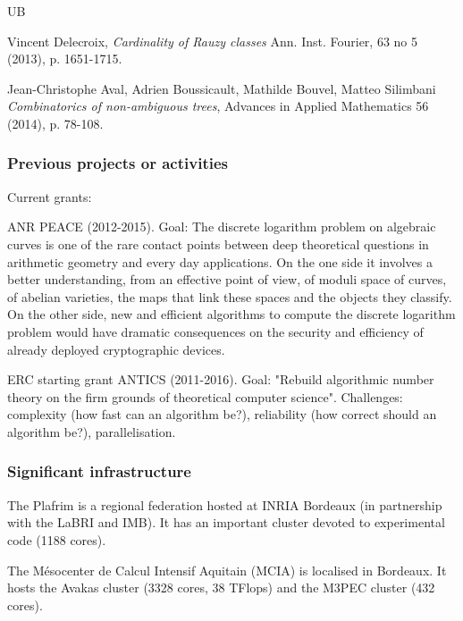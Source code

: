 \begin{sitedescription}{UB}
\begin{compactenum}
\item
Vincent Delecroix,
\textit{Cardinality of Rauzy classes}
Ann. Inst. Fourier, 63 no 5 (2013), p. 1651-1715.

\item
Jean-Christophe Aval, Adrien Boussicault, Mathilde Bouvel, Matteo Silimbani
\textit{Combinatorics of non-ambiguous trees},
Advances in Applied Mathematics 56 (2014), p. 78-108.
\end{compactenum}

\subsubsection*{Previous projects or activities}

Current grants:
\begin{compactenum}
\item
 ANR PEACE (2012-2015).
    Goal: The discrete logarithm problem on algebraic curves is one of the rare
    contact points between deep theoretical questions in arithmetic geometry and
    every day applications. On the one side it involves a better understanding,
    from an effective point of view, of moduli space of curves, of abelian
    varieties, the maps that link these spaces and the objects they classify.
    On the other side, new and efficient algorithms to compute the discrete
    logarithm problem would have dramatic consequences on the security and
    efficiency of already deployed cryptographic devices. 

\item
ERC starting grant ANTICS (2011-2016).
    Goal: "Rebuild algorithmic number theory on the firm grounds of theoretical
    computer science".
    Challenges: complexity (how fast can an algorithm be?), reliability
    (how correct should an algorithm be?), parallelisation.
\end{compactenum}

\subsubsection*{Significant infrastructure}
\begin{compactenum}
\item The Plafrim is a regional federation hosted at INRIA Bordeaux (in partnership with the LaBRI and IMB). It has an important cluster devoted to experimental code (1188 cores).
\item The M\'esocenter de Calcul Intensif Aquitain (MCIA) is localised
in Bordeaux. It hosts the Avakas cluster (3328 cores,  38 TFlops) and the
M3PEC cluster (432 cores).
\end{compactenum}

\end{sitedescription}




